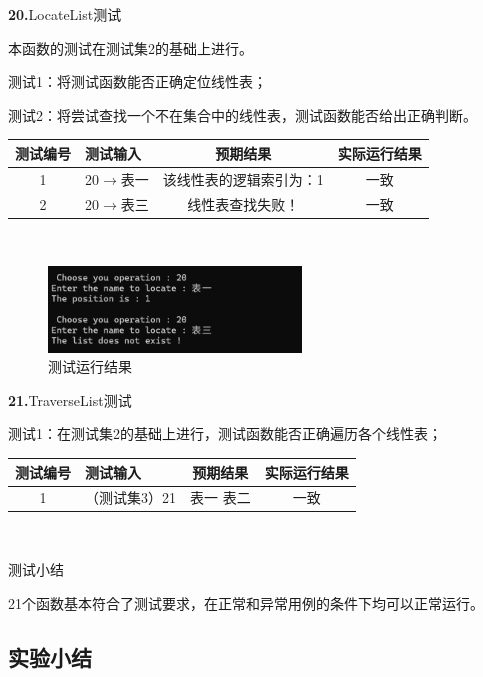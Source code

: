 \documentclass[supercite]{Experimental_Report}
\theoremstyle{definition}
\begin{document}
\noindent\textbf{20.}LocateList测试
	
本函数的测试在测试集2的基础上进行。

测试1：将测试函数能否正确定位线性表；

测试2：将尝试查找一个不在集合中的线性表，测试函数能否给出正确判断。

\vspace{0.5em}

\begin{tabular}{|c|p{2.7cm}|c|c|}
	\hline
	测试编号 & 测试输入 & 预期结果 & 实际运行结果 \\
	\hline
	1 & 20$\rightarrow$表一 & 该线性表的逻辑索引为：1 & 一致 \\
	\hline
	2 & 20$\rightarrow$表三 & 线性表查找失败！ & 一致 \\
	\hline
\end{tabular}

~\

 \begin{figure}[H]
 	\centering
 	\includegraphics[width=0.6\textwidth]{images/线性表测试20.png}
 	\caption{测试运行结果}
 	\label{txlab}
 \end{figure}


\noindent\textbf{21.}TraverseList测试
	
测试1：在测试集2的基础上进行，测试函数能否正确遍历各个线性表；

\vspace{0.5em}

\begin{tabular}{|c|p{2.7cm}|c|c|}
	\hline
	测试编号 & 测试输入 & 预期结果 & 实际运行结果 \\
	\hline
	1 & （测试集3）21 & 表一 表二 & 一致 \\
	\hline
\end{tabular}

~\

测试小结

21个函数基本符合了测试要求，在正常和异常用例的条件下均可以正常运行。

\subsection{实验小结}
\end{document}
